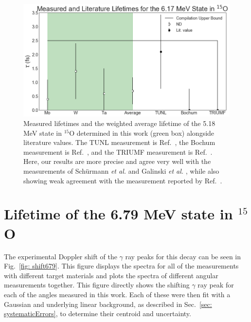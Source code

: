 \begin{figure}
\centering
\includegraphics[width=\linewidth]{figures/lifetimes617.png}
\caption{Measured lifetimes and the weighted average lifetime of the 5.18 MeV state in $^{15}$O determined in this work (green box) alongside literature values. The TUNL measurement is Ref.\ \cite{Bertone2001}, the Bochum measurement is Ref.\ \cite{Schurmann2008}, and the TRIUMF measurement is Ref.\ \cite{Galinski2014}. Here, our results are more precise and agree very well with the measurements of Sch{\"u}rmann \textit{et al.} \cite{Schurmann2008} and Galinski \textit{et al.} \cite{Galinski2014}, while also showing weak agreement with the measurement reported by Ref.\ \cite{Bertone2001}. }
\label{fig: lifetimes617}
\end{figure}



\section{Lifetime of the 6.79 MeV state in $^{15}$O}
\label{sec: lifetime679}


The experimental Doppler shift of the $\gamma$ ray peaks for this decay can be seen in Fig.\ \ref{fig: shift679}. This figure displays the spectra for all of the measurements with different target materials and plots the spectra of different angular measurements together. This figure directly shows the shifting $\gamma$ ray peak for each of the angles measured in this work. Each of these were then fit with a Gaussian and underlying linear background, as described in Sec.\ \ref{sec: systematicErrors}, to determine their centroid and uncertainty. 



